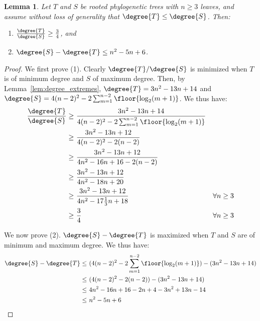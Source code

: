 \documentclass{amsart}
\newtheorem{lemma}[theorem]{Lemma}
\begin{document}
\begin{lemma}
	\label{lem:degree_max_delta}
	Let $T$ and $S$ be rooted phylogenetic trees with $n \ge 3$ leaves, and assume without loss of generality that $\degree{T} \le \degree{S}$.
	Then:
	\begin{enumerate}
		\item $\frac{\degree{T}}{\degree{S}} \ge \frac{3}{4}$, and
		\item $\degree{S} - \degree{T} \le n^2 - 5n + 6$.
	\end{enumerate}
\end{lemma}
\begin{proof}
	We first prove (1).
	Clearly $\degree{T} / \degree{S}$ is minimized when $T$ is of minimum degree and $S$ of maximum degree.
	Then, by Lemma~\ref{lem:degree_extremes}, $\degree{T} = 3n^2 - 13n + 14$ and $\degree{S} = 4(n-2)^2 - 2 \sum_{m=1}^{n-2} \floor{\log_2(m+1)}$.
	We thus have:
	\begin{align}
		\frac{\degree{T}}{\degree{S}} \ge\ &\frac{3n^2 - 13n + 14}{4(n-2)^2 - 2 \sum_{m=1}^{n-2} \floor{\log_2(m+1)}} \\
		\ge\ &\frac{3n^2 - 13n + 12}{4(n-2)^2 - 2(n-2)} \\
		\ge\ &\frac{3n^2 - 13n + 12}{4n^2 - 16n + 16 - 2(n-2)} \\
		\ge\ &\frac{3n^2 - 13n + 12}{4n^2 - 18n + 20} \\
		\ge\ &\frac{3n^2 - 13n + 12}{4n^2 - 17\frac{1}{3}n + 18} &\forall n \ge 3 \\
		\ge\ &\frac{3}{4} &\forall n \ge 3
	\end{align}


	We now prove (2).
	$\degree{S} - \degree{T}$  is maximized when $T$ and $S$ are of minimum and maximum degree.
	We thus have:
	\begin{align}
		\degree{S} - \degree{T}
		\le\ &(4(n-2)^2 - 2 \sum_{m=1}^{n-2} \floor{\log_2(m+1)})
		- (3n^2 - 13n + 14) \\
		\le\ &(4(n-2)^2 - 2(n-2)) - (3n^2 - 13n + 14) \\
		\le\ &4n^2 - 16n + 16 - 2n +4 - 3n^2 + 13n - 14 \\
		\le\ &n^2 - 5n + 6
	\end{align}
\end{proof}
\end{document}
